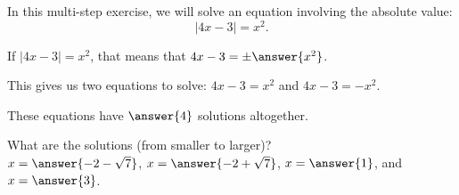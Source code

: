 \documentclass{ximera}
\author{Elizabeth Campolongo}
\begin{document}
In this multi-step exercise, we will solve an equation involving the absolute value: 
$$|4x-3|=x^2.$$

\begin{exercise}
If $|4x - 3| = x^2$, that means that $4x - 3 = \pm \answer{x^2}$.

\begin{exercise}
This gives us two equations to solve: $4x - 3 = x^2$ and $4x - 3 = -x^2$. 

These equations have $\answer{4}$ solutions altogether.
\begin{exercise}
What are the solutions (from smaller to larger)?\\
$x = \answer{-2-\sqrt{7}}$, $x=\answer{-2+\sqrt{7}}$, $x=\answer{1}$, and $x = \answer{3}$. 
\end{exercise}
\end{exercise}
\end{exercise}
\end{document}
